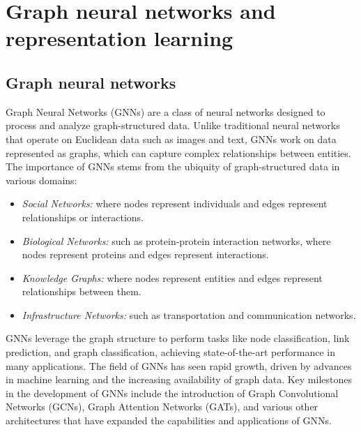 \chapter{Graph neural networks and representation learning}
\label{sec:RepresentationLearning}

\section{Graph neural networks}

Graph Neural Networks (GNNs) are a class of neural networks designed to process and analyze graph-structured data. Unlike traditional neural networks that operate on Euclidean data such as images and text, GNNs work on data represented as graphs, which can capture complex relationships between entities. The importance of GNNs stems from the ubiquity of graph-structured data in various domains:

\begin{itemize}
    \item \emph{Social Networks:} where nodes represent individuals and edges represent relationships or interactions.
    \item \emph{Biological Networks:} such as protein-protein interaction networks, where nodes represent proteins and edges represent interactions.
    \item \emph{Knowledge Graphs:} where nodes represent entities and edges represent relationships between them.
    \item \emph{Infrastructure Networks:} such as transportation and communication networks.
\end{itemize}

GNNs leverage the graph structure to perform tasks like node classification, link prediction, and graph classification, achieving state-of-the-art performance in many applications.
The field of GNNs has seen rapid growth, driven by advances in machine learning and the increasing availability of graph data. Key milestones in the development of GNNs include the introduction of Graph Convolutional Networks (GCNs), Graph Attention Networks (GATs), and various other architectures that have expanded the capabilities and applications of GNNs.

